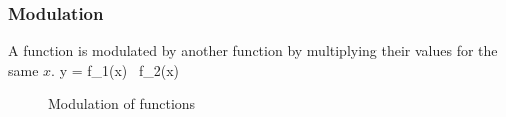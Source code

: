 \subsubsection{Modulation}
A function is modulated by another function by multiplying their values for the same $x$. 
\bnn y = f_1(x) \, f_2(x) \enn

\vs\begin{figure}[!h]
    \centering
    \hspace{0.5cm}
      \svs
    \caption{Modulation of functions} \label{fig19}
\end{figure}
